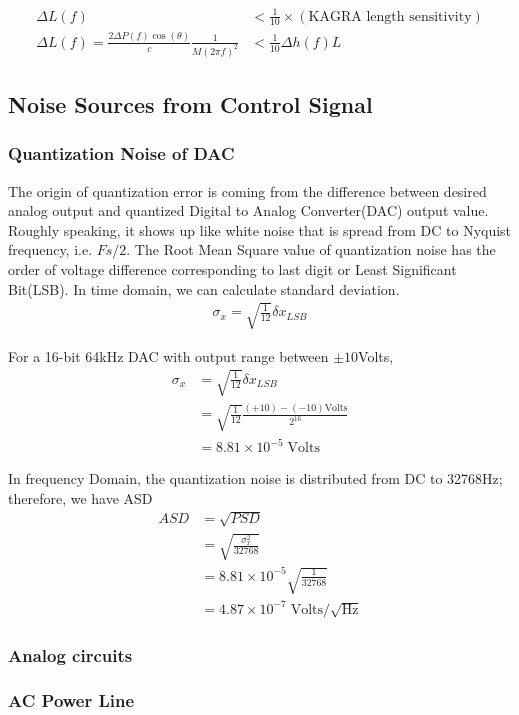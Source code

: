 \begin{align}
   \Delta L(f) &< \frac{1}{10} \times (\text{KAGRA length sensitivity})\\
   \Delta L(f) =\frac{2 \Delta P(f) \cos(\theta)}{c} \frac{1}{M(2 \pi f)^2} &< \frac{1}{10} \Delta h(f) L
\end{align}




\subsection{Noise Sources from Control Signal}
\subsubsection{Quantization Noise of DAC}


The origin of quantization error is coming from the difference between desired analog output and quantized Digital to Analog Converter(DAC) output value. Roughly speaking, it shows up like white noise that is spread from DC to Nyquist frequency, i.e. $Fs/2$.
The Root Mean Square value of quantization noise has the order of voltage difference corresponding to last digit or Least Significant Bit(LSB). In time domain, we can calculate standard deviation.
\begin{align}
   \sigma_x = \sqrt{\frac{1}{12}} \delta x_{LSB}
\end{align}

For a 16-bit 64kHz DAC with output range between $\pm 10$Volts, 
\begin{align}
    \sigma_x &= \sqrt{\frac{1}{12}} \delta x_{LSB} \\
             &= \sqrt{\frac{1}{12}} \frac{(+10)-(-10) \mathrm{Volts}}{2^{16}} \\
             &= 8.81 \times 10^{-5} \;\mathrm{Volts}
\end{align}

In frequency Domain, the quantization noise is distributed from DC to 32768Hz; therefore, we have ASD
\begin{align}
    ASD &= \sqrt{PSD} \\
        &= \sqrt{ \frac{\sigma_x^2}{32768} } \\
        &= 8.81 \times 10^{-5} \sqrt{\frac{1}{32768}} \\
        &= 4.87 \times 10^{-7} \;\mathrm{Volts}/\sqrt{\mathrm{Hz}} 
\end{align}

\subsubsection{Analog circuits}


\subsubsection{AC Power Line}



